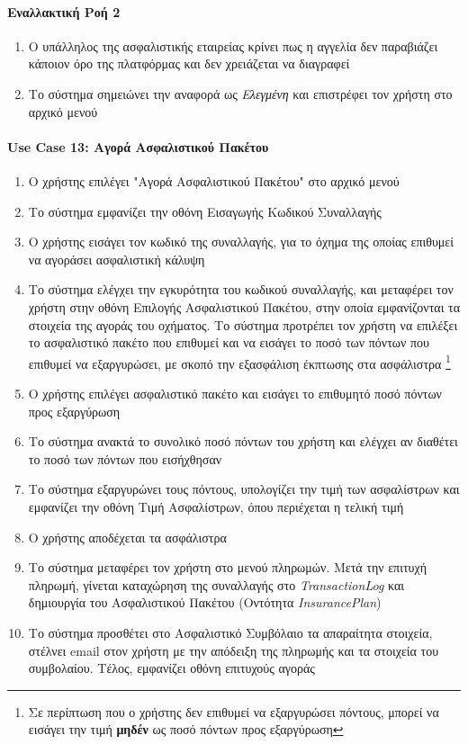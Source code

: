 \documentclass{../ol-softwaremanual}
\begin{document}
	\paragraph{Εναλλακτική Ροή 2}
	\begin{enumerate}
		\item Ο υπάλληλος της ασφαλιστικής εταιρείας κρίνει πως η αγγελία δεν παραβιάζει κάποιον όρο της πλατφόρμας και δεν χρειάζεται να διαγραφεί
		\item Το σύστημα σημειώνει την αναφορά ως \textit{Ελεγμένη}	και επιστρέφει τον χρήστη στο αρχικό μενού
	\end{enumerate}
	
	\paragraph{\en Use Case 13: \gr Αγορά Ασφαλιστικού Πακέτου}
	\begin{enumerate}
		\item Ο χρήστης επιλέγει \en"\gr Αγορά Ασφαλιστικού Πακέτου\en" \gr στο αρχικό μενού
		\item Το σύστημα εμφανίζει την οθόνη Εισαγωγής Κωδικού Συναλλαγής
		\item Ο χρήστης εισάγει τον κωδικό της συναλλαγής, για το όχημα της οποίας επιθυμεί να αγοράσει ασφαλιστική κάλυψη
		\item Το σύστημα ελέγχει την εγκυρότητα του κωδικού συναλλαγής, και μεταφέρει τον χρήστη στην οθόνη Επιλογής Ασφαλιστικού Πακέτου, στην οποία εμφανίζονται τα στοιχεία της αγοράς του οχήματος. Το σύστημα προτρέπει τον χρήστη να επιλέξει το ασφαλιστικό πακέτο που επιθυμεί και να εισάγει το ποσό των πόντων που επιθυμεί να εξαργυρώσει, με σκοπό την εξασφάλιση έκπτωσης στα ασφάλιστρα \footnote[3]{Σε περίπτωση που ο χρήστης δεν επιθυμεί να εξαργυρώσει πόντους, μπορεί να εισάγει την τιμή \textbf{μηδέν} ως ποσό πόντων προς εξαργύρωση}
		\item Ο χρήστης επιλέγει ασφαλιστικό πακέτο και εισάγει το επιθυμητό ποσό πόντων προς εξαργύρωση
		\item Το σύστημα ανακτά το συνολικό ποσό πόντων του χρήστη και	ελέγχει αν διαθέτει το ποσό των πόντων που εισήχθησαν
		\item Το σύστημα εξαργυρώνει τους πόντους, υπολογίζει την τιμή των ασφαλίστρων και εμφανίζει την οθόνη Τιμή Ασφαλίστρων, όπου περιέχεται η τελική τιμή 
		\item Ο χρήστης αποδέχεται τα ασφάλιστρα
		\item Το σύστημα μεταφέρει τον χρήστη στο μενού πληρωμών. Μετά την επιτυχή πληρωμή, γίνεται καταχώρηση της συναλλαγής στο \en \textit{TransactionLog} \gr και δημιουργία του Ασφαλιστικού Πακέτου (Οντότητα \en \textit{InsurancePlan}\gr)
		\item Το σύστημα προσθέτει στο Ασφαλιστικό Συμβόλαιο τα απαραίτητα στοιχεία, στέλνει \en email \gr στον χρήστη με την απόδειξη της πληρωμής και τα στοιχεία του συμβολαίου. Τέλος, εμφανίζει οθόνη επιτυχούς αγοράς
	\end{enumerate}
	
\end{document}
